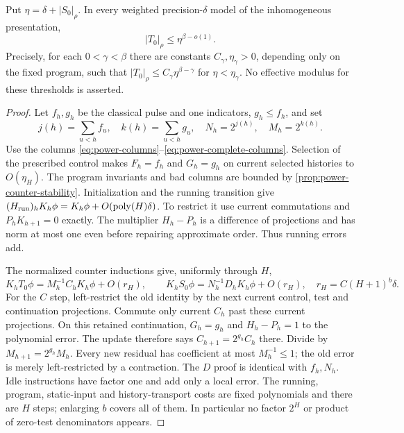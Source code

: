 \begin{proposition}\label{prop:power-calibration}
Put $\eta=\delta+|S_0|_\rho$. In every weighted precision-$\delta$ model of the inhomogeneous presentation,
\[
 |T_0|_\rho\le\eta^{\beta-o(1)}.
\]
Precisely, for each $0<\gamma<\beta$ there are constants $C_\gamma,\eta_\gamma>0$, depending only on the fixed program, such that $|T_0|_\rho\le C_\gamma\eta^{\beta-\gamma}$ for $\eta<\eta_\gamma$. No effective modulus for these thresholds is asserted.
\end{proposition}
\begin{proof}
Let $f_h,g_h$ be the classical pulse and one indicators, $g_h\le f_h$, and set
\[
 j(h)=\sum_{u<h}f_u,\quad k(h)=\sum_{u<h}g_u,\quad N_h=2^{j(h)},\quad M_h=2^{k(h)}.
\]
Use the columns \eqref{eq:power-columns}--\eqref{eq:power-complete-columns}. Selection of the prescribed control makes $F_h=f_h$ and $G_h=g_h$ on current selected histories to $O(\eta_H)$. The program invariants and bad columns are bounded by \cref{prop:power-counter-stability}.
Initialization and the running transition give $(H_{\rm run})_hK_h\phi=K_h\phi+O(\operatorname{poly}(H)\delta)$. To restrict it use current commutations and $P_hK_{h+1}=0$ exactly. The multiplier $H_h-P_h$ is a difference of projections and has norm at most one even before repairing approximate order. Thus running errors add.

The normalized counter inductions give, uniformly through $H$,
\begin{equation}\label{eq:power-normalized}
 K_hT_0\phi=M_h^{-1}C_hK_h\phi+O(r_H),\qquad
 K_hS_0\phi=N_h^{-1}D_hK_h\phi+O(r_H),\quad r_H=C(H+1)^b\delta.
\end{equation}
For the $C$ step, left-restrict the old identity by the next current control, test and continuation projections. Commute only current $C_h$ past these current projections. On this retained continuation, $G_h=g_h$ and $H_h-P_h=1$ to the polynomial error. The update therefore says $C_{h+1}=2^{g_h}C_h$ there. Divide by $M_{h+1}=2^{g_h}M_h$. Every new residual has coefficient at most $M_h^{-1}\le1$; the old error is merely left-restricted by a contraction. The $D$ proof is identical with $f_h,N_h$. Idle instructions have factor one and add only a local error. The running, program, static-input and history-transport costs are fixed polynomials and there are $H$ steps; enlarging $b$ covers all of them. In particular no factor $2^H$ or product of zero-test denominators appears.


\end{proof}
